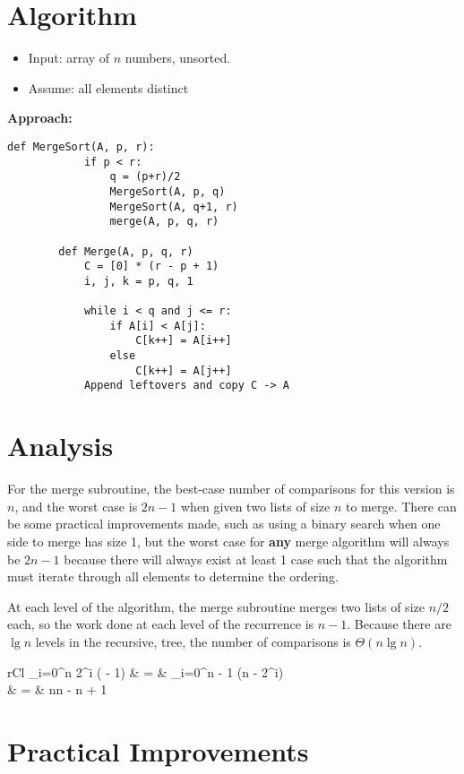 \documentclass[11pt]{article}
\begin{document}
\section{Algorithm}
	\begin{itemize}
		\itemsep=-2pt
		\item Input: array of $n$ numbers, unsorted.
		\item Assume: all elements distinct
	\end{itemize}
	
	\textbf{Approach:}
	\begin{lstlisting}[autogobble=true]
		def MergeSort(A, p, r):
			if p < r:
				q = (p+r)/2
				MergeSort(A, p, q)
				MergeSort(A, q+1, r)
				merge(A, p, q, r)
				
		def Merge(A, p, q, r)
			C = [0] * (r - p + 1)
			i, j, k = p, q, 1
			
			while i < q and j <= r:
				if A[i] < A[j]:
					C[k++] = A[i++]
				else
					C[k++] = A[j++]
			Append leftovers and copy C -> A
	\end{lstlisting}
		
\section{Analysis}
	For the merge subroutine, the best-case number of comparisons for this version is $n$, and the worst case is $2n - 1$ when given two lists of size $n$ to merge. There can be some practical improvements made, such as using a binary search when one side to merge has size 1, but the worst case for \textbf{any} merge algorithm will always be $2n-1$ because there will always exist at least 1 case such that the algorithm must iterate through all elements to determine the ordering.
	
	At each level of the algorithm, the merge subroutine merges two lists of size $n/2$ each, so the work done at each level of the recurrence is $n - 1$. Because there are $\lg n$ levels in the recursive, tree, the number of comparisons is $\Theta(n\lg n)$.
	
	\begin{IEEEeqnarray}{rCl}
		\sum_{i=0}^{\lg n} 2^i \left( - 1\right) & = & \sum_{i=0}^{\lg n - 1} (n - 2^i)\\
		& = & n\lg n - n + 1
	\end{IEEEeqnarray}
		
\section{Practical Improvements}
\end{document}
